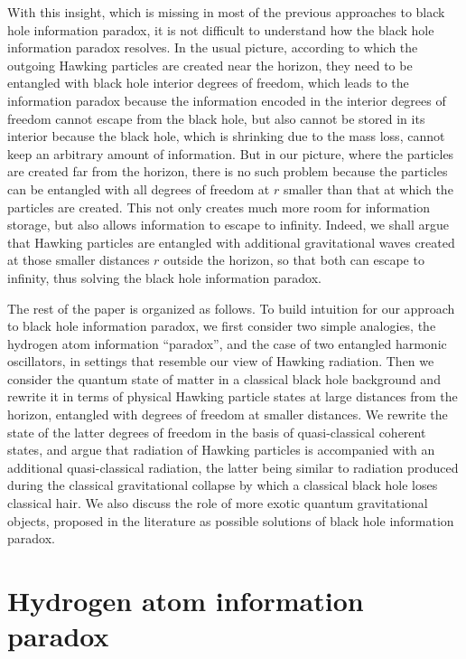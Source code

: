 \documentclass[12pt]{article}
\begin{document}
With this insight, which is missing in most of the previous approaches to black hole information paradox, 
it is not difficult to understand 
how the black hole information paradox resolves. In the usual picture, 
according to which the outgoing Hawking particles are created near the horizon, they need to be entangled with 
black hole interior degrees of freedom, which leads to the information paradox because the information encoded in the 
interior degrees of freedom cannot escape from the black hole, but also cannot be stored in its interior because the black hole, 
which is shrinking due to the mass loss, cannot keep an arbitrary amount of information.   
But in our picture, where the particles are created far from the horizon, there is no such problem because 
the particles can be entangled with all degrees of freedom at $r$ smaller than that at which the particles are created.
This not only creates much more room for information storage, but also allows information to escape to infinity.
Indeed, we shall argue that Hawking particles are entangled with additional gravitational waves created at those smaller 
distances $r$ outside the horizon, so that both can escape to infinity, thus solving the black hole information paradox.   

The rest of the paper is organized as follows. To build intuition for our approach to black hole information paradox,
we first consider two simple analogies, 
the hydrogen atom information ``paradox'', and the case of two entangled harmonic oscillators, in settings that resemble 
our view of Hawking radiation. Then we consider the quantum state of matter in a classical black hole background and rewrite
it in terms of physical Hawking particle states at large distances from the horizon, entangled with degrees of freedom at smaller 
distances. We rewrite the state of the latter degrees of freedom in the basis of quasi-classical coherent states, 
and argue that radiation of Hawking particles is accompanied with an additional quasi-classical radiation,
the latter being similar to radiation produced during the classical gravitational collapse by which a classical black hole
loses classical hair. We also discuss the role of more exotic quantum gravitational objects, proposed in the literature
as possible solutions of black hole information paradox.      

\section{Hydrogen atom information paradox}
\end{document}

